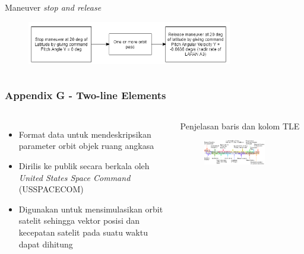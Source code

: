\documentclass[8pt]{beamer}
\begin{document}
\begin{frame}
\begin{columns}[T]
\begin{block}{Maneuver \textit{stop and release}}
\begin{figure}
      \end{figure}
      \begin{figure}
          \includegraphics[width=0.8\textwidth]{figure/exmaneuver1.png}
      \end{figure}
    \end{block}
  \end{columns}
\end{frame}

\begin{frame}
  \frametitle{Appendix G - Two-line Elements}
  \begin{columns}[c]
      \begin{itemize}
        \item Format data untuk mendeskripsikan parameter orbit objek ruang angkasa
        \item Dirilis ke publik secara berkala oleh \textit{United States Space Command} (USSPACECOM)
        \item Digunakan untuk mensimulasikan orbit satelit sehingga vektor posisi dan kecepatan satelit pada suatu waktu dapat dihitung
      \end{itemize}

          \begin{block}{\center Penjelasan baris dan kolom TLE}
      \begin{figure}
          \includegraphics[width=0.8\textwidth]{figure/tlemeaning.png}
      \end{figure}
          \end{block}
  \end{columns}
\end{frame}
\end{document}
